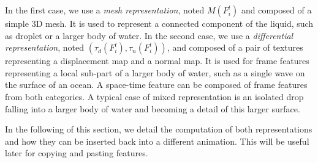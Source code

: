 In the first case, we use a \emph{mesh representation}, noted $M(F^t_i)$ and composed of a simple $3$D mesh. 
It is used to represent a connected component of the liquid, such as droplet or a larger body of water.
In the second case, we use a \emph{differential representation}, noted $(\tau_d(F^t_i), \tau_n(F^t_i))$, and composed of a pair of textures representing a displacement map and a normal map.
It is used for frame features representing a local sub-part of a larger body of water, such as a single wave on the surface of an ocean.
A space-time feature can be composed of frame features from both categories.
A typical case of mixed representation is an isolated drop falling into a larger body of water and becoming a detail of this larger surface.

In the following of this section, we detail the computation of both representations and how they can be inserted back into a different animation. This will be useful later for copying and pasting features.
